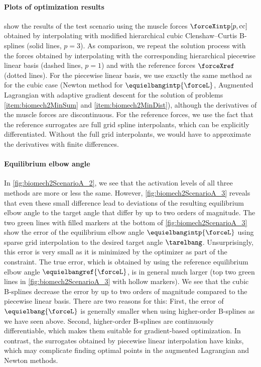 \paragraph{Plots of optimization results}

show the results of the test scenario using the muscle forces
$\forceXintp[p,\cc]$ obtained by interpolating with
modified hierarchical cubic Clenshaw--Curtis B-splines (solid lines, $p = 3$).
As comparison, we repeat the solution process
with the forces obtained by interpolating with the
corresponding hierarchical piecewise linear basis (dashed lines, $p = 1$) and
with the reference forces $\forceXref$ (dotted lines).
For the piecewise linear basis,
we use exactly the same method as for the cubic case
(Newton method for $\equielbangintp{\forceL}$,
Augmented Lagrangian with adaptive gradient descent for the
solution of problems \ref{item:biomech2MinSum} and \ref{item:biomech2MinDist}),
although the derivatives of the muscle forces are discontinuous.
For the reference forces, we use the fact that the reference surrogates
are full grid spline interpolants, which can be explicitly differentiated.
Without the full grid interpolants,
we would have to approximate the derivatives with finite differences.

\paragraph{Equilibrium elbow angle}

In \cref{fig:biomech2ScenarioA_2}, we see that the activation levels
of all three methods are more or less the same.
However, \cref{fig:biomech2ScenarioA_3} reveals that even these small
difference lead to deviations of the resulting equilibrium elbow angle
to the target angle that differ by up to two orders of magnitude.
The two green lines with filled markers at the bottom of
\cref{fig:biomech2ScenarioA_3} show the error of
the equilibrium elbow angle $\equielbangintp{\forceL}$
using sparse grid interpolation to the desired target angle $\tarelbang$.
Unsurprisingly, this error is very small as
it is minimized by the optimizer as part of the constraint.
The true error, which is obtained by
using the reference equilibrium elbow angle $\equielbangref{\forceL}$,
is in general much larger
(top two green lines in \cref{fig:biomech2ScenarioA_3}
with hollow markers).
We see that the cubic B-splines decrease the error
by up to two orders of magnitude compared to the
piecewise linear basis.
There are two reasons for this:
First, the error of $\equielbang{\forceL}$ is generally smaller
when using higher-order B-splines as we have seen above.
Second, higher-order B-splines are continuously differentiable,
which makes them suitable for gradient-based optimization.
In contrast, the surrogates obtained by piecewise linear interpolation
have kinks, which may complicate finding optimal points
in the augmented Lagrangian and Newton methods.

